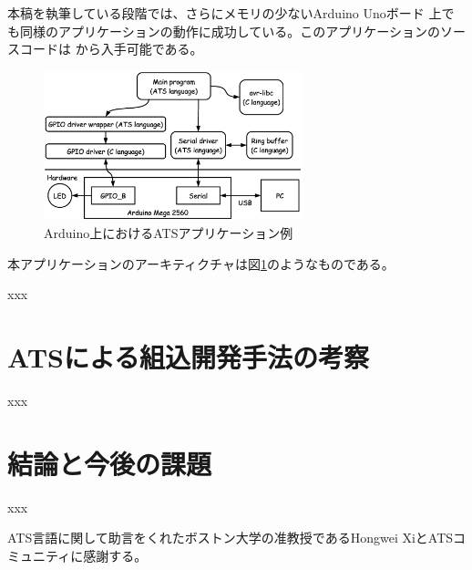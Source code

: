 \documentclass{ipsjprosym}
\begin{document}
本稿を執筆している段階では、さらにメモリの少ないArduino Unoボード \cite{arduino-uno} 上でも同様のアプリケーションの動作に成功している。このアプリケーションのソースコードは \cite{arduino-ats} から入手可能である。

\begin{figure}[h]
\centering
\includegraphics[width=75mm]{draw/demo_ats_arduino.eps}
\caption{Arduino上におけるATSアプリケーション例}
\label{fig:demo_ats_arduino}
\end{figure}

本アプリケーションのアーキティクチャは図\ref{fig:demo_ats_arduino}のようなものである。

xxx

\section{ATSによる組込開発手法の考察}

xxx

\section{結論と今後の課題}

xxx

\begin{acknowledgment}
ATS言語に関して助言をくれたボストン大学の准教授であるHongwei XiとATSコミュニティに感謝する。
\end{acknowledgment}
\end{document}
